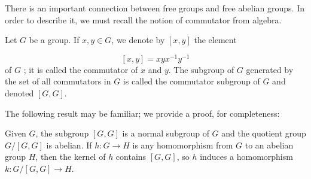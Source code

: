 There is an important connection between free groups and free abelian groups. In order to describe it, we must recall the notion of commutator from algebra.

\begin{definition}
Let \(G\) be a group. If \(x,y \in G\), we denote by \([ {x,y}]\) the element

\[
[ {x,y}] = {xy}x^{-1}y^{-1}
\]
of \(G\) ; it is called the commutator of \(x\) and \(y\). The subgroup of \(G\) generated by the set of all commutators in \(G\) is called the commutator subgroup of \(G\) and denoted \([ {G,G}]\).
\end{definition}

The following result may be familiar; we provide a proof, for completeness:

\begin{lemma}
\label{lem:\thetheorem}
Given \(G\), the subgroup \([ {G,G}]\) is a normal subgroup of \(G\) and the quotient group \(G/[ {G,G}]\) is abelian. If \(h : G \rightarrow H\) is any homomorphism from \(G\) to an abelian group \(H\), then the kernel of \(h\) contains \([ {G,G}]\), so \(h\) induces a homomorphism \(k : G/[ {G,G}] \rightarrow H\).
\end{lemma}

